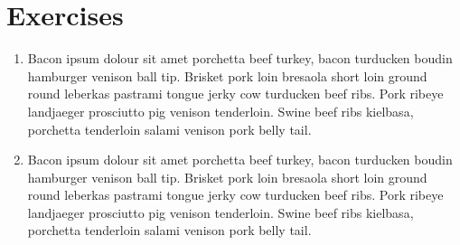 

%
\section{Exercises}

\begin{enumerate}
  \item Bacon ipsum dolour sit amet porchetta beef turkey, bacon turducken boudin hamburger venison ball tip. Brisket pork loin bresaola short loin ground round leberkas pastrami tongue jerky cow turducken beef ribs. Pork ribeye landjaeger prosciutto pig venison tenderloin. Swine beef ribs kielbasa, porchetta tenderloin salami venison pork belly tail.
  \item Bacon ipsum dolour sit amet porchetta beef turkey, bacon turducken boudin hamburger venison ball tip. Brisket pork loin bresaola short loin ground round leberkas pastrami tongue jerky cow turducken beef ribs. Pork ribeye landjaeger prosciutto pig venison tenderloin. Swine beef ribs kielbasa, porchetta tenderloin salami venison pork belly tail.
\end{enumerate}